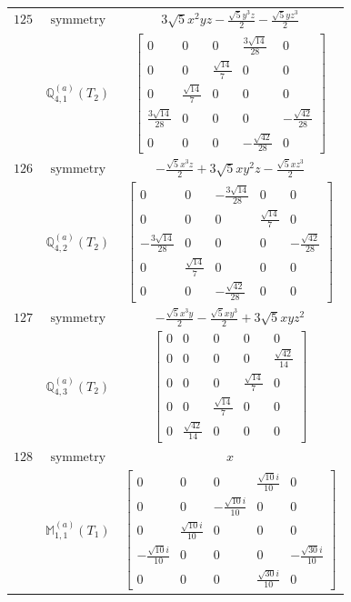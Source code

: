 \documentclass[fleqn,8pt,landscape]{jsarticle}
\begin{document}
\begin{longtable}{ccc}
$ 125 $ & $ \text{symmetry} $ & $ 3 \sqrt{5} x^{2} y z - \frac{\sqrt{5} y^{3} z}{2} - \frac{\sqrt{5} y z^{3}}{2} $ \\
$  $ & $ \mathbb{Q}_{4,1}^{(a)}(T_{2}) $ & $ \begin{bmatrix} 0 & 0 & 0 & \frac{3 \sqrt{14}}{28} & 0 \\ 0 & 0 & \frac{\sqrt{14}}{7} & 0 & 0 \\ 0 & \frac{\sqrt{14}}{7} & 0 & 0 & 0 \\ \frac{3 \sqrt{14}}{28} & 0 & 0 & 0 & - \frac{\sqrt{42}}{28} \\ 0 & 0 & 0 & - \frac{\sqrt{42}}{28} & 0 \end{bmatrix} $ \\ \hline
$ 126 $ & $ \text{symmetry} $ & $ - \frac{\sqrt{5} x^{3} z}{2} + 3 \sqrt{5} x y^{2} z - \frac{\sqrt{5} x z^{3}}{2} $ \\
$  $ & $ \mathbb{Q}_{4,2}^{(a)}(T_{2}) $ & $ \begin{bmatrix} 0 & 0 & - \frac{3 \sqrt{14}}{28} & 0 & 0 \\ 0 & 0 & 0 & \frac{\sqrt{14}}{7} & 0 \\ - \frac{3 \sqrt{14}}{28} & 0 & 0 & 0 & - \frac{\sqrt{42}}{28} \\ 0 & \frac{\sqrt{14}}{7} & 0 & 0 & 0 \\ 0 & 0 & - \frac{\sqrt{42}}{28} & 0 & 0 \end{bmatrix} $ \\ \hline
$ 127 $ & $ \text{symmetry} $ & $ - \frac{\sqrt{5} x^{3} y}{2} - \frac{\sqrt{5} x y^{3}}{2} + 3 \sqrt{5} x y z^{2} $ \\
$  $ & $ \mathbb{Q}_{4,3}^{(a)}(T_{2}) $ & $ \begin{bmatrix} 0 & 0 & 0 & 0 & 0 \\ 0 & 0 & 0 & 0 & \frac{\sqrt{42}}{14} \\ 0 & 0 & 0 & \frac{\sqrt{14}}{7} & 0 \\ 0 & 0 & \frac{\sqrt{14}}{7} & 0 & 0 \\ 0 & \frac{\sqrt{42}}{14} & 0 & 0 & 0 \end{bmatrix} $ \\ \hline
$ 128 $ & $ \text{symmetry} $ & $ x $ \\
$  $ & $ \mathbb{M}_{1,1}^{(a)}(T_{1}) $ & $ \begin{bmatrix} 0 & 0 & 0 & \frac{\sqrt{10} i}{10} & 0 \\ 0 & 0 & - \frac{\sqrt{10} i}{10} & 0 & 0 \\ 0 & \frac{\sqrt{10} i}{10} & 0 & 0 & 0 \\ - \frac{\sqrt{10} i}{10} & 0 & 0 & 0 & - \frac{\sqrt{30} i}{10} \\ 0 & 0 & 0 & \frac{\sqrt{30} i}{10} & 0 \end{bmatrix} $ \\ \hline

\end{longtable}
\end{document}
